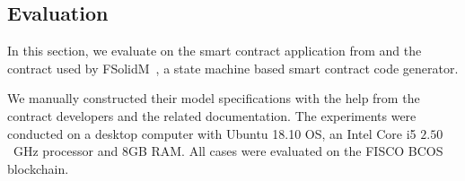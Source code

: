 \subsection{Evaluation}
\label{sec:eval}

In this section, we evaluate \modcon on the \wecredit smart contract application from \company and
the  contract used by FSolidM~\cite{mavridou2018designing}, a state machine
based smart contract code generator.

We manually constructed their model specifications with the help from the contract developers and
the related documentation.
The experiments were conducted on a desktop computer with Ubuntu 18.10 OS, an Intel Core i5 $2.50$~GHz processor and $8$GB RAM.
All cases were evaluated on the FISCO BCOS blockchain.

